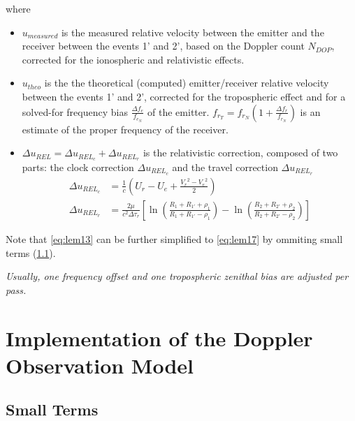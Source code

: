 where 
\begin{itemize}
    \item \(u_{measured}\) is the measured relative velocity between the emitter and 
    the receiver between the events 1' and 2', based on the Doppler count \(N_{DOP}\), 
    corrected for the ionospheric and relativistic effects.

    \item \(u_{theo}\) is the the theoretical (computed) emitter/receiver relative velocity 
    between the events 1' and 2', corrected for the tropospheric effect and for a solved-for 
    frequency bias \(\frac{\Delta f_e}{f_{e_N}}\) of the emitter. \(f_{r_T} = f_{r_N} (1 + \frac{\Delta f_r}{f_{r_N}})\) 
    is an estimate of the proper frequency of the receiver.

    \item \(\Delta u_{REL} = \Delta u_{{REL}_c} + \Delta u_{{REL}_r}\) is the relativistic 
    correction, composed of two parts: the clock correction \(\Delta u_{{REL}_c}\) and the 
    travel correction \(\Delta u_{{REL}_r}\)
    \begin{subequations} \label{eq:lem14}
        \begin{align}
            \Delta u_{{REL}_c} & = \frac{1}{c} 
              (U_r - U_e + \frac{{V_r}^2 - {V_e}^2}{2}) \label{eq:lem14a}\\
            \Delta u_{{REL}_r} & = \frac{2 \mu}{c^2 \Delta\tau_r} \left[ 
              \ln{(\frac{R_1 + R_{1'} + \rho_1}{R_1 + R_{1'} - \rho_1})} - 
              \ln{(\frac{R_2 + R_{2'} + \rho_2}{R_2 + R_{2'} - \rho_2})} \right] \label{eq:lem14b}
        \end{align}
    \end{subequations}
\end{itemize}

Note that \ref{eq:lem13} can be further simplified to \ref{eq:lem17} by 
ommiting small terms (\ref{ssec:small-terms}).

\emph{Usually, one frequency offset and one tropospheric zenithal bias are adjusted per pass.}

\section{Implementation of the Doppler Observation Model}

\subsection{Small Terms}
\label{ssec:small-terms}


